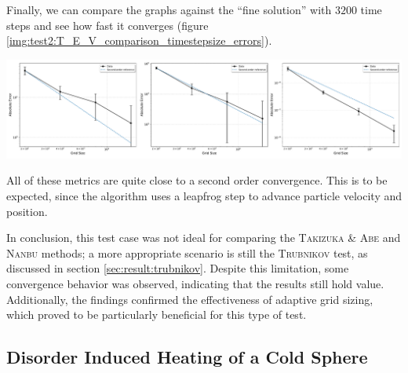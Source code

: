 Finally, we can compare the graphs against the ``fine solution'' with $3200$ time steps and see how fast it converges (figure \ref{img:test2:T_E_V_comparison_timestepsize_errors}). \\
\begin{minipage}[h]{\linewidth}
    \vspace{5pt}
    \centering
    \includegraphics[width=\linewidth]{ressources/test2/T_E_V_comparison_timestepsize_errors.pdf}
    \label{img:test2:T_E_V_comparison_timestepsize_errors}
    \vspace{5pt}
\end{minipage}
All of these metrics are quite close to a second order convergence. This is to be expected, since the algorithm uses a leapfrog step to advance particle velocity and position.

In conclusion, this test case was not ideal for comparing the \textsc{Takizuka} \& \textsc{Abe} and \textsc{Nanbu} methods; a more appropriate scenario is still the \textsc{Trubnikov} test, as discussed in section \ref{sec:result:trubnikov}. Despite this limitation, some convergence behavior was observed, indicating that the results still hold value. Additionally, the findings confirmed the effectiveness of adaptive grid sizing, which proved to be particularly beneficial for this type of test. 


\subsection{Disorder Induced Heating of a Cold Sphere}\label{sec:result:coldSphere}

